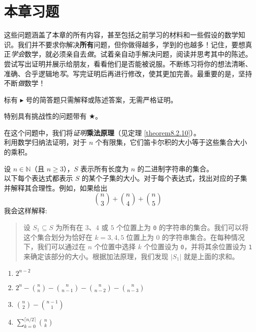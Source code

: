 \section{本章习题}

这些问题涵盖了本章的所有内容，甚至包括之前学习的材料和一些假设的数学知识。我们并不要求你解决\textbf{所有}问题，但你做得越多，学到的也越多！记住，要想真正\emph{学会}数学，就必须亲自去\emph{做}。试着亲自动手解决问题，阅读并思考其中的陈述。尝试写出证明并展示给朋友，看看他们是否能被说服。不断练习将你的想法清晰、准确、合乎逻辑地\emph{写}。写完证明后再进行修改，使其更加完善。最重要的是，坚持不断\emph{做}数学！

标有 $\blacktriangleright$ 号的简答题只需解释或陈述答案，无需严格证明。

特别具有挑战性的问题带有 $\bigstar$。\\

\begin{exercise}\label{exc:exercises8.9.1}
    在这个问题中，我们将\emph{证明}\textbf{乘法原理}（见定理 \ref{theorem8.2.10}）。\\
    利用数学归纳法证明，对于 $n$ 个有限集，它们笛卡尔积的大小等于这些集合大小的乘积。
\end{exercise}

\begin{exercise}
    设 $n \in \mathbb{N}$（且 $n \ge 3$），$S$ 表示所有长度为 $n$ 的二进制字符串的集合。\\
    以下每个表达式都表示 $S$ 的某个子集的大小。对于每个表达式，找出对应的子集并解释其合理性。例如，如果给出
    \[{n \choose 3}+{n \choose 4}+{n \choose 5}\]
    我会这样解释:
    \begin{quote}
        设 $S_1 \subseteq S$ 为所有在 $3$、$4$ 或 $5$ 个位置上为 \verb|0| 的字符串的集合。我们可以将这个集合划分为恰好在 $k = 3,4,5$ 位置上为 $0$ 的字符串集合。在每种情况下，我们可以通过在 $n$ 个位置中选择 $k$ 个位置设为 \verb|0|，并将其余位置设为 \verb|1| 来确定该部分的大小。根据加法原理，我们发现 $|S_1|$ 就是上面的求和。
    \end{quote}
    \begin{enumerate}[label=(\alph*)]
        \item $2^{n-2}$
        \item $2^n-{n \choose n}-{n \choose n-1}-{n \choose n-2}-{n \choose n-3}$
        \item ${n \choose 2}-{n-1 \choose 1}$
        \item $\displaystyle \sum_{k=0}^{\lceil n/2 \rceil} {n \choose k}$
    \end{enumerate}
\end{exercise}

